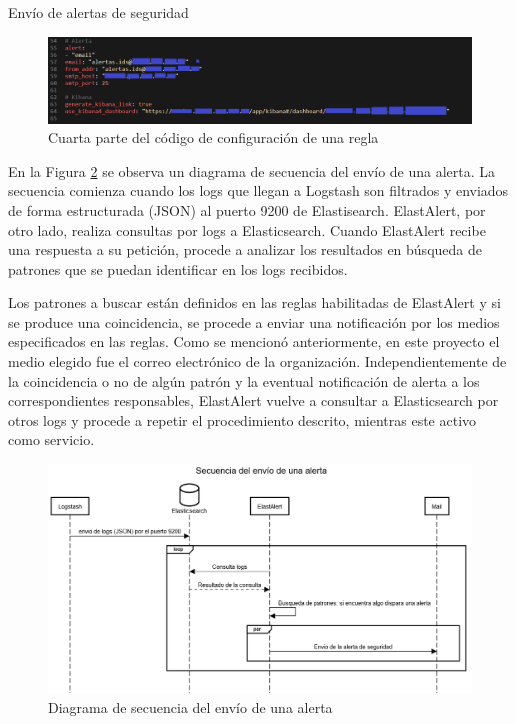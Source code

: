 \begin{section}{Envío de alertas de seguridad}
\begin{itemize}
    \end{itemize}
    \begin{figure}[H]
    \centering
        \includegraphics[width=1\textwidth]{./iteracion_2_imagenes/6-codigoAlerta4.png}
        \caption{Cuarta parte del código de configuración de una regla}
        \label{fig:iter2_4_codigo}
    \end{figure}
    \FloatBarrier
    En la Figura \ref{fig:iter2_diagrama_envio_alertas} se observa un diagrama de secuencia del envío de una alerta.
    La secuencia comienza cuando los logs que llegan a Logstash son filtrados y enviados de forma estructurada (JSON) al puerto 9200 de Elastisearch. ElastAlert, por otro lado, realiza consultas por logs a Elasticsearch. Cuando ElastAlert recibe una respuesta a su petición, procede a analizar los resultados en búsqueda de patrones que se puedan identificar en los logs recibidos. \par
    Los patrones a buscar están definidos en las reglas habilitadas de ElastAlert y si se produce una coincidencia, se procede a enviar una notificación por los medios especificados en las reglas. Como se mencionó anteriormente, en este proyecto el medio elegido fue el correo electrónico de la organización. Independientemente de la coincidencia o no de algún patrón y la eventual notificación de alerta a los correspondientes responsables, ElastAlert vuelve a consultar a Elasticsearch por otros logs y procede a repetir el procedimiento descrito, mientras este activo como servicio.\par 
    \begin{figure}[H]
    \centering
        \includegraphics[width=1\textwidth]{./iteracion_2_imagenes/2-diagrama-de-secuencia-envio-alerta.png}
        \caption{Diagrama de secuencia del envío de una alerta}
        \label{fig:iter2_diagrama_envio_alertas}
    \end{figure}
    \end{section}

\label{iteracion2}
